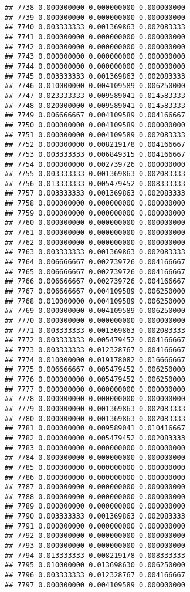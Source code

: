 \documentclass[
]{article}
\begin{document}
\begin{verbatim}
## 7738 0.000000000 0.000000000 0.000000000
## 7739 0.000000000 0.000000000 0.000000000
## 7740 0.003333333 0.001369863 0.002083333
## 7741 0.000000000 0.000000000 0.000000000
## 7742 0.000000000 0.000000000 0.000000000
## 7743 0.000000000 0.000000000 0.000000000
## 7744 0.000000000 0.000000000 0.000000000
## 7745 0.003333333 0.001369863 0.002083333
## 7746 0.010000000 0.004109589 0.006250000
## 7747 0.023333333 0.009589041 0.014583333
## 7748 0.020000000 0.009589041 0.014583333
## 7749 0.006666667 0.004109589 0.004166667
## 7750 0.000000000 0.004109589 0.000000000
## 7751 0.000000000 0.004109589 0.002083333
## 7752 0.000000000 0.008219178 0.004166667
## 7753 0.003333333 0.006849315 0.004166667
## 7754 0.000000000 0.002739726 0.000000000
## 7755 0.003333333 0.001369863 0.002083333
## 7756 0.013333333 0.005479452 0.008333333
## 7757 0.003333333 0.001369863 0.002083333
## 7758 0.000000000 0.000000000 0.000000000
## 7759 0.000000000 0.000000000 0.000000000
## 7760 0.000000000 0.000000000 0.000000000
## 7761 0.000000000 0.000000000 0.000000000
## 7762 0.000000000 0.000000000 0.000000000
## 7763 0.003333333 0.001369863 0.002083333
## 7764 0.006666667 0.002739726 0.004166667
## 7765 0.006666667 0.002739726 0.004166667
## 7766 0.006666667 0.002739726 0.004166667
## 7767 0.006666667 0.004109589 0.006250000
## 7768 0.010000000 0.004109589 0.006250000
## 7769 0.000000000 0.004109589 0.006250000
## 7770 0.000000000 0.000000000 0.000000000
## 7771 0.003333333 0.001369863 0.002083333
## 7772 0.003333333 0.005479452 0.004166667
## 7773 0.003333333 0.012328767 0.004166667
## 7774 0.010000000 0.019178082 0.016666667
## 7775 0.006666667 0.005479452 0.006250000
## 7776 0.000000000 0.005479452 0.006250000
## 7777 0.000000000 0.000000000 0.000000000
## 7778 0.000000000 0.000000000 0.000000000
## 7779 0.000000000 0.001369863 0.002083333
## 7780 0.000000000 0.001369863 0.002083333
## 7781 0.000000000 0.009589041 0.010416667
## 7782 0.000000000 0.005479452 0.002083333
## 7783 0.000000000 0.000000000 0.000000000
## 7784 0.000000000 0.000000000 0.000000000
## 7785 0.000000000 0.000000000 0.000000000
## 7786 0.000000000 0.000000000 0.000000000
## 7787 0.000000000 0.000000000 0.000000000
## 7788 0.000000000 0.000000000 0.000000000
## 7789 0.000000000 0.000000000 0.000000000
## 7790 0.003333333 0.001369863 0.002083333
## 7791 0.000000000 0.000000000 0.000000000
## 7792 0.000000000 0.000000000 0.000000000
## 7793 0.000000000 0.000000000 0.000000000
## 7794 0.013333333 0.008219178 0.008333333
## 7795 0.010000000 0.013698630 0.006250000
## 7796 0.003333333 0.012328767 0.004166667
## 7797 0.000000000 0.004109589 0.000000000

\end{verbatim}
\end{document}
